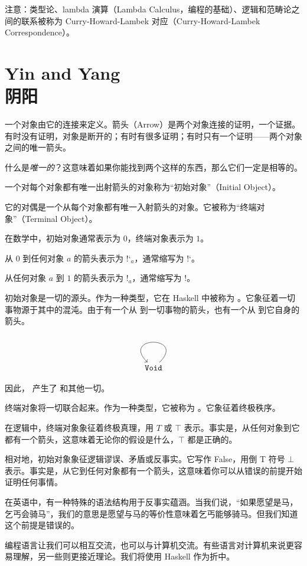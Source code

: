\documentclass[DaoFP]{subfiles}
\begin{document}
 注意：类型论、lambda 演算（Lambda Calculus，编程的基础）、逻辑和范畴论之间的联系被称为 Curry-Howard-Lambek 对应（Curry-Howard-Lambek Correspondence）。

 \section{Yin and Yang\\阴阳}

 一个对象由它的连接来定义。箭头（Arrow）是两个对象连接的证明，一个证据。有时没有证明，对象是断开的；有时有很多证明；有时只有一个证明——两个对象之间的唯一箭头。

 什么是\emph{唯一的}？这意味着如果你能找到两个这样的东西，那么它们一定是相等的。

 一个对每个对象都有唯一出射箭头的对象称为“初始对象”（Initial Object）。

 它的对偶是一个从每个对象都有唯一入射箭头的对象。它被称为“终端对象”（Terminal Object）。

 在数学中，初始对象通常表示为 $0$，终端对象表示为 $1$。

 从 $0$ 到任何对象 $a$ 的箭头表示为 $\mbox{!`}_a$，通常缩写为 $\mbox{!`}$。

 从任何对象 $a$ 到 $1$ 的箭头表示为 $!_a$，通常缩写为 $!$。

 初始对象是一切的源头。作为一种类型，它在 Haskell 中被称为 。它象征着一切事物源于其中的混沌。由于有一个从  到一切事物的箭头，也有一个从  到它自身的箭头。

 \[
  \begin{tikzcd}
   \hask{Void}
   \arrow[loop]
  \end{tikzcd}
 \]

 因此， 产生了  和其他一切。

 终端对象将一切联合起来。作为一种类型，它被称为 。它象征着终极秩序。

 在逻辑中，终端对象象征着终极真理，用 $T$ 或 $ \top$ 表示。事实是，从任何对象到它都有一个箭头，这意味着无论你的假设是什么，$ \top$ 都是正确的。

 相对地，初始对象象征逻辑谬误、矛盾或反事实。它写作 False，用倒 T 符号 $ \bot$ 表示。事实是，从它到任何对象都有一个箭头，这意味着你可以从错误的前提开始证明任何事情。

 在英语中，有一种特殊的语法结构用于反事实蕴涵。当我们说，“如果愿望是马，乞丐会骑马”，我们的意思是愿望与马的等价性意味着乞丐能够骑马。但我们知道这个前提是错误的。

 编程语言让我们可以相互交流，也可以与计算机交流。有些语言对计算机来说更容易理解，另一些则更接近理论。我们将使用 Haskell 作为折中。
\end{document}
